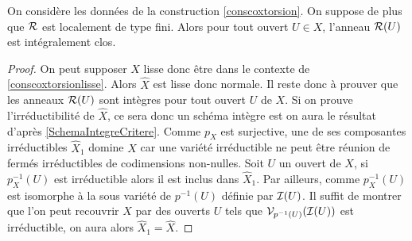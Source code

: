 \begin{thm}[Car. 0]
On considère les données de la construction \ref{conscoxtorsion}. On suppose de plus que $\mathcal{R}$ est localement de type fini. Alors pour tout ouvert $U\in X$, l'anneau $\mathcal{R}(U)$ est intégralement clos.
\end{thm}
\begin{proof}
On peut supposer $X$ lisse donc être dans le contexte de \ref{conscoxtorsionlisse}. Alors $\widehat{X}$ est lisse donc normale. Il reste donc à prouver que les anneaux $\mathcal{R}(U)$ sont intègres pour tout ouvert $U$ de $X$. Si on prouve l'irréductibilité de $\widehat{X}$, ce sera donc un schéma intègre est on aura le résultat d'après \ref{SchemaIntegreCritere}. Comme $p_X$ est surjective, une de ses composantes irréductibles $\widehat{X}_1$ domine $X$ car une variété irréductible ne peut être réunion de fermés irréductibles de codimensions non-nulles. Soit $U$ un ouvert de $X$, si $p_X^{-1}(U)$ est irréductible alors il est inclus dans $\widehat{X}_1$. Par ailleurs, comme $p_X^{-1}(U)$ est isomorphe à la sous variété de $p^{-1}(U)$ définie par $\mathcal{I}(U)$. Il suffit de montrer que l'on peut recouvrir $X$ par des ouverts $U$ tels que $\mathcal{V}_{p^{-1}(U)}(\mathcal{I}(U))$ est irréductible, on aura alors $\widehat{X}_1=\widehat{X}$.


\end{proof}
